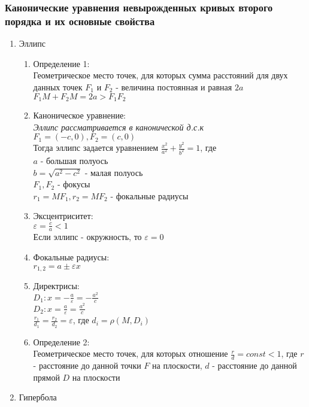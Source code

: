 \documentclass[12pt]{article}
\begin{document}
\subsubsection{Канонические уравнения невырожденных кривых второго порядка и их основные свойства}
\begin{enumerate}
    \item Эллипс
    \begin{enumerate}
        \item Определение 1:\\
        Геометрическое место точек, для которых сумма расстояний для двух данных точек $F_1$ и $F_2$ - величина постоянная и равная $2a$\\
        $F_1M+F_2M=2a > F_1F_2$
        \item Каноническое уравнение:\\
        \textit{Эллипс рассматривается в канонической д.с.к}\\
        $F_1=(-c,0), F_2=(c,0)$\\
        Тогда эллипс задается уравнением $\frac{x^2}{a^2}+\frac{y^2}{b^2}=1$, где \\
        $a$ - большая полуось\\
        $b = \sqrt{a^2-c^2}$ - малая полуось\\
        $F_1,F_2$ - фокусы\\
        $r_1=MF_1, r_2=MF_2$ - фокальные радиусы
        \item Эксцентриситет:\\
        $\varepsilon = \frac ca < 1$\\
        Если эллипс - окружность, то $\varepsilon = 0$
        \item Фокальные радиусы:\\
        $r_{1,2} = a\pm \varepsilon x$
        \item Директрисы:\\
        $D_1: x=-\frac a\varepsilon = -\frac{a^2}c$\\
        $D_2: x=\frac a\varepsilon = \frac{a^2}c$\\
        $\frac {r_1}{d_1} = \frac {r_2}{d_2}=\varepsilon$, где $d_i = \rho(M,D_i)$
        \item Определение 2:\\
        Геометрическое место точек, для которых отношение $\frac rd = const < 1$, где $r$ - расстояние до данной точки $F$ на плоскости, $d$ - расстояние до данной прямой $D$ на плоскости
    \end{enumerate}
    \item Гипербола

\end{enumerate}
\end{document}
